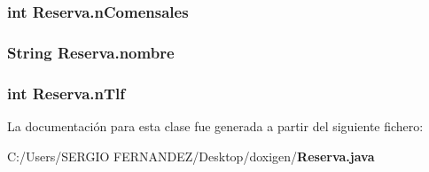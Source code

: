 \subsubsection[{nComensales}]{\setlength{\rightskip}{0pt plus 5cm}int {\bf Reserva.nComensales}\hspace{0.3cm}{\tt  [package]}}\label{class_reserva_352989e85ce4e711df55f6c12742c72c}


\subsubsection[{nombre}]{\setlength{\rightskip}{0pt plus 5cm}String {\bf Reserva.nombre}\hspace{0.3cm}{\tt  [package]}}\label{class_reserva_ea3901e502bc82a553e7021c381c1b86}


\subsubsection[{nTlf}]{\setlength{\rightskip}{0pt plus 5cm}int {\bf Reserva.nTlf}\hspace{0.3cm}{\tt  [package]}}\label{class_reserva_d879a7cb2711327c9f4f7c9058f95ab9}




La documentación para esta clase fue generada a partir del siguiente fichero:\begin{CompactItemize}
\item 
C:/Users/SERGIO FERNANDEZ/Desktop/doxigen/{\bf Reserva.java}\end{CompactItemize}
